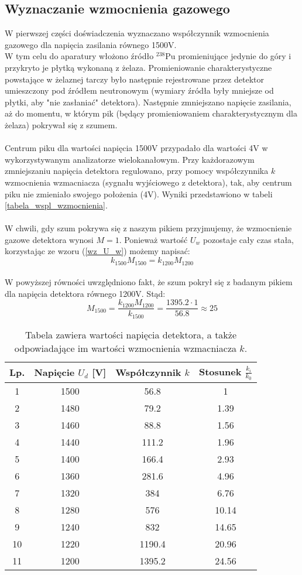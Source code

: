 \documentclass{article}
\begin{document}
\subsection{Wyznaczanie wzmocnienia gazowego}
W pierwszej części doświadczenia wyznaczano współczynnik wzmocnienia gazowego dla napięcia zasilania równego 1500V. \\
W tym celu do aparatury włożono źródło $^{238}$Pu promieniujące jedynie do góry i przykryto je płytką wykonaną z żelaza. Promieniowanie charakterystyczne powstające w żelaznej tarczy było następnie rejestrowane przez detektor umieszczony pod źródłem neutronowym (wymiary źródła były mniejsze od płytki, aby "nie zasłaniać" detektora). Następnie zmniejszano napięcie zasilania, aż do momentu, w którym pik (będący promieniowaniem charakterystycznym dla żelaza) pokrywał się z szumem.\\\\
Centrum piku dla wartości napięcia 1500V przypadało dla wartości 4V w wykorzystywanym analizatorze wielokanałowym. Przy każdorazowym zmniejszaniu napięcia detektora regulowano, przy pomocy współczynnika $k$ wzmocnienia wzmacniacza (sygnału wyjściowego z detektora), tak, aby centrum piku nie zmieniało swojego położenia (4V). Wyniki przedstawiono w tabeli \ref{tabela_wspl_wzmocnienia}. \\\\
W chwili, gdy szum pokrywa się z naszym pikiem przyjmujemy, że wzmocnienie gazowe detektora wynosi $M=1$. Ponieważ wartość $U_w$ pozostaje cały czas stała, korzystając ze wzoru (\ref{wz_U_w}) możemy napisać:\\
\[k_{1500}M_{1500} = k_{1200}M_{1200}
\]\\
W powyższej równości uwzględniono fakt, że szum pokrył się z badanym pikiem dla napięcia detektora równego 1200V. Stąd:\\
\[M_{1500} = \frac{k_{1200}M_{1200}}{k_{1500}} = \frac{1395.2 \cdot 1}{56.8} \approx 25
\]


\begin{table}[h!]
	\centering
	\caption{Tabela zawiera wartości napięcia detektora, a także odpowiadające im wartości wzmocnienia wzmacniacza $k$.}
	\begin{tabular}{|c|c|c|c|}
		\hline
		Lp. & Napięcie $U_d$ [V] & Współczynnik $k$ & Stosunek $\frac{k_i}{k_0}$ \\\hline
		1 & 1500 & 56.8 & 1 \\\hline
		2 & 1480 & 79.2 & 1.39 \\\hline
		3 & 1460 & 88.8 & 1.56 \\\hline
		4 & 1440 & 111.2 & 1.96 \\\hline
		5 & 1400 & 166.4 & 2.93 \\\hline
		6 & 1360 & 281.6 & 4.96 \\\hline
		7 & 1320 & 384 & 6.76 \\\hline
		8 & 1280 & 576 & 10.14 \\\hline
		9 & 1240 & 832 & 14.65 \\\hline
		10 & 1220 & 1190.4 & 20.96 \\\hline
		11 & 1200 & 1395.2 & 24.56 \\\hline
	\end{tabular}
\end{table}
\end{document}
